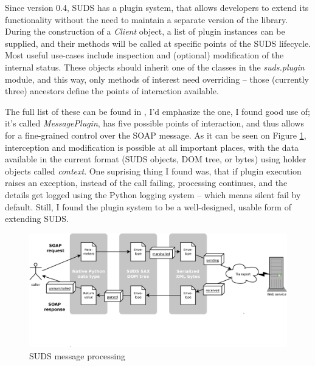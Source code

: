 Since version 0.4, SUDS has a plugin system, that allows developers to extend its functionality without the need to maintain a separate version of the library. During the construction of a \emph{Client} object, a list of plugin instances can be supplied, and their methods will be called at specific points of the SUDS lifecycle. Most useful use-cases include inspection and (optional) modification of the internal status. These objects should inherit one of the classes in the \emph{suds.plugin} module, and this way, only methods of interest need overriding -- those (currently three) ancestors define the points of interaction available.

The full list of these can be found in \cite{suds-doc}, I'd emphasize the one, I found good use of; it's called \emph{MessagePlugin}, has five possible points of interaction, and thus allows for a fine-grained control over the SOAP message. As it can be seen on Figure \ref{fig:sudsMessage}, interception and modification is possible at all important places, with the data available in the current format (SUDS objects, DOM tree, or bytes) using holder objects called \emph{context}. One suprising thing I found was, that if plugin execution raises an exception, instead of the call failing, processing continues, and the details get logged using the Python logging system -- which means silent fail by default. Still, I found the plugin system to be a well-designed, usable form of extending SUDS.

\begin{figure}[htbp]
 \centering
 \includegraphics[width=\textwidth]{images/sudsMessage.pdf}
 \caption{SUDS message processing}
 \label{fig:sudsMessage}
\end{figure}
